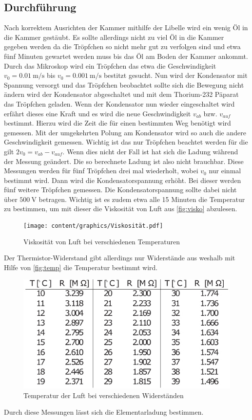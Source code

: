 \subsection{Durchführung}
\label{ssec:Durchführung}
Nach korrektem Ausrichten der Kammer mithilfe der Libelle wird ein wenig Öl in die Kammer gestäubt.
Es sollte allerdings nicht zu viel Öl in die Kammer gegeben werden da die Tröpfchen so nicht mehr gut zu verfolgen sind und etwa fünf Minuten gewartet werden muss bis das Öl am Boden der Kammer ankommt.
Durch das Mikroskop wird ein Tröpfchen das etwa die Geschwindigkeit $v_0=\qty{0.01}{\meter\per\second}$ bis $v_0=\qty{0.001}{\meter\per\second}$ bestitzt gesucht.
Nun wird der Kondensator mit Spannung versorgt und das Tröpfchen beobachtet sollte sich die Bewegung nicht ändern wird der Kondensator abgeschaltet
und mit dem Thorium-232 Päparat das Tröpfchen geladen.
Wenn der Kondensator nun wieder eingeschaltet wird erfährt dieses eine Kraft und es wird die neue Geschwindigkeit $v_{ab}$ bzw. $v_{auf}$ bestimmt.
Hierzu wird die Zeit die für einen bestimmten Weg benötigt wird gemessen. Mit der umgekehrten Polung am Kondensator wird so auch die andere Geschwindigkeit gemessen.
Wichtig ist das nur Tröpfchen beachtet werden für die gilt $2v_0=v_{ab}-v_{auf}$. Wenn dies nicht der Fall ist hat sich die Ladung während der Messung geändert.
Die so berechnete Ladung ist also nicht brauchbar.
Diese Messungen werden für fünf Tröpfchen drei mal wiederholt, wobei $v_0$ nur einmal bestimmt wird. Dann wird die Kondensatorspannung erhöht.
Bei dieser werden fünf weitere Tröpfchen gemessen. Die Kondensatorspannung sollte dabei nicht über $\qty{500}{\volt}$ betragen.
Wichtig ist es zudem etwa alle 15 Minuten die Temperatur zu bestimmen, um mit dieser die Viskosität von Luft aus \autoref{fig:visko} abzulesen.
\begin{figure}[H]
    \centering
    \texttt{[image: content/graphics/Viskosität.pdf]}
    \caption{Viskosität von Luft bei verschiedenen Temperaturen \cite{v503}}
    \label{fig:visko}
\end{figure}
Der Thermistor-Widerstand gibt allerdings nur Widerstände aus weshalb mit Hilfe von \autoref{fig:temp} die Temperatur bestimmt wird.
\begin{figure}[H]
    \centering
    \includegraphics{content/graphics/Temperatur.pdf}
    \caption{Temperatur der Luft bei verschiedenen Widerständen \cite{v503}}
    \label{fig:temp}
\end{figure}
Durch diese Messungen lässt sich die Elementarladung bestimmen.

